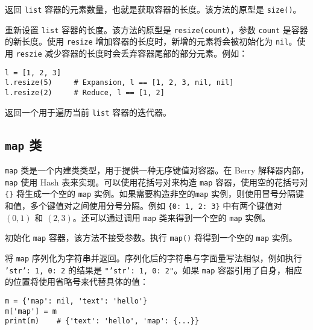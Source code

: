 
返回 \texttt{list} 容器的元素数量，也就是获取容器的长度。该方法的原型是 \texttt{size()}。


重新设置 \texttt{list} 容器的长度。该方法的原型是 \texttt{resize(count)}，参数 \texttt{count} 是容器的新长度。使用 \texttt{resize} 增加容器的长度时，新增的元素将会被初始化为 \texttt{nil}。使用 \texttt{reszie} 减少容器的长度时会丢弃容器尾部的部分元素。例如：
\begin{lstlisting}[language=berry, numbers=none]
l = [1, 2, 3]
l.resize(5)     # Expansion, l == [1, 2, 3, nil, nil]
l.resize(2)     # Reduce, l == [1, 2]
\end{lstlisting}


返回一个用于遍历当前 \texttt{list} 容器的迭代器。

\subsection{\texttt{map} 类}

\texttt{map} 类是一个内建类类型，用于提供一种无序键值对容器。在 Berry 解释器内部，\texttt{map} 使用 Hash 表来实现。可以使用花括号对来构造 \texttt{map} 容器，使用空的花括号对 \texttt{\{\}} 将生成一个空的 \texttt{map} 实例。如果需要构造非空的\texttt{map} 实例，则使用冒号分隔键和值，多个键值对之间使用分号分隔。例如 \texttt{\{0: 1, 2: 3\}} 中有两个键值对 $(0, 1)$ 和 $(2, 3)$。还可以通过调用 \texttt{map} 类来得到一个空的 \texttt{map} 实例。


初始化 \texttt{map} 容器，该方法不接受参数。执行 \texttt{map()} 将得到一个空的 \texttt{map} 实例。


将 \texttt{map} 序列化为字符串并返回。序列化后的字符串与字面量写法相似，例如执行 \texttt{{'str': 1, 0: 2}} 的结果是 \texttt{"{'str': 1, 0: 2}"}。如果 \texttt{map} 容器引用了自身，相应的位置将使用省略号来代替具体的值：
\begin{lstlisting}[language=berry, numbers=none]
m = {'map': nil, 'text': 'hello'}
m['map'] = m
print(m)    # {'text': 'hello', 'map': {...}}
\end{lstlisting}



